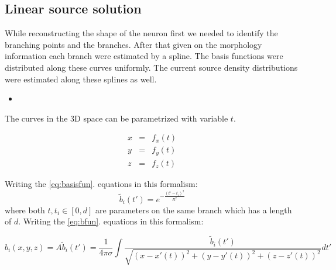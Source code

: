 \documentclass[12pt,a4paper]{article}
\begin{document}
\subsection{ Linear source solution }
While reconstructing the shape of the neuron first we needed to identify the branching points and the branches. After that given on the morphology information each branch were estimated by a spline. The basis functions were distributed along these curves uniformly. The current source density distributions were estimated along these splines as well. 



\begin{itemize}
\item 
\end{itemize}
The curves in the 3D space can be parametrized with variable $t$. 


\begin{eqnarray}
\displaystyle x &=& f_x(t)  \nonumber \\
\displaystyle y &=& f_y(t)  \\
\displaystyle z &=& f_z(t)  \nonumber 
\end{eqnarray}


Writing the \ref{eq:basisfun}. equations in this formalism:
\begin{equation}
\tilde{b}_i (t') = e^{- \frac{(t' - t_i)^2}{R^2}}
\end{equation}
where both $t,t_i \in \left[ 0, d \right] $ are parameters on the same branch which has a length of $d$. 
Writing the \ref{eq:bfun}. equations in this formalism:


\begin{equation}
b_i (x,y,z)= A \tilde{b}_i (t')= \frac{1}{4 \pi \sigma} \int 
\frac{ \tilde{b}_i (t')}{\sqrt{(x-x'(t))^2+(y-y'(t))^2+(z-z'(t))^2}} dt'
\end{equation}
\end{document}
